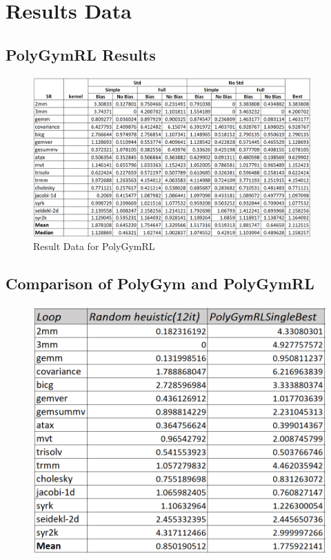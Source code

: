 \documentclass[logo,msc]{infthesis}           %
\begin{document}
\appendix

\chapter{Results Data}

\section{PolyGymRL Results}

\begin{figure}[htbp]
  \centering
  \includegraphics[width=0.95\textwidth]{Images/BenchMarking.png}    
  \caption{Result Data for PolyGymRL}
  \label{fig:BenchMarking}
\end{figure}

\section{Comparison of PolyGym and PolyGymRL}

\begin{figure}
\centering
\includegraphics[width=0.7\linewidth]{Images/Benchmarking_Single.png}
\label{Benchmarking_Single}
\end{figure}
\end{document}
